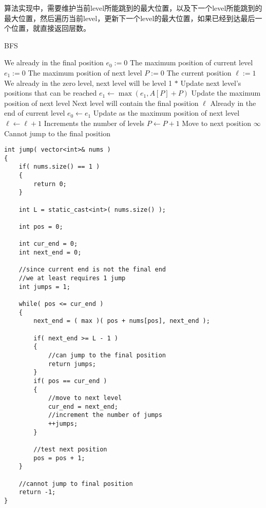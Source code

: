 算法实现中，需要维护当前level所能跳到的最大位置，以及下一个level所能跳到的最大位置，然后遍历当前level，更新下一个level的最大位置，如果已经到达最后一个位置，就直接返回层数。

\setcounter{algorithm}{0}
\begin{algorithm}[H]
\caption{BFS}
\begin{algorithmic}[1]
\State {} \Comment We already in the final position
\EndIf
\State $e_0 := 0$ \Comment The maximum position of current level
\State $e_1 := 0$ \Comment The maximum position of next level
\State $P:=0$ \Comment The current position
\State $\ell := 1$ \Comment We already in the zero level, next level will be level 1
\State $\ast$ Update next level's positions that can be reached
\State $e_1 \gets \max(e_1, A[P]+P)$ \Comment Update the maximum position of next level
 \Comment Next level will contain the final position
\State \Return $\ell$
\EndIf
{} \Comment Already in the end of current level
\State $e_0 \gets e_1$ \Comment Update as the maximum position of next level
\State $\ell\gets \ell+1$ \Comment Increments the number of levels
\EndIf
\State $P \gets P+1$ \Comment Move to next position
\EndWhile
\State \Return $\infty$ \Comment Cannot jump to the final position
\EndProcedure
\end{algorithmic}
\end{algorithm}

\setcounter{lstlisting}{0}
\begin{lstlisting}[style=customc, caption={BFS}]
int jump( vector<int>& nums )
{
    if( nums.size() == 1 )
    {
        return 0;
    }

    int L = static_cast<int>( nums.size() );

    int pos = 0;

    int cur_end = 0;
    int next_end = 0;

    //since current end is not the final end
    //we at least requires 1 jump
    int jumps = 1;

    while( pos <= cur_end )
    {
        next_end = ( max )( pos + nums[pos], next_end );

        if( next_end >= L - 1 )
        {
            //can jump to the final position
            return jumps;
        }
        if( pos == cur_end )
        {
            //move to next level
            cur_end = next_end;
            //increment the number of jumps
            ++jumps;
        }

        //test next position
        pos = pos + 1;
    }

    //cannot jump to final position
    return -1;
}
\end{lstlisting}